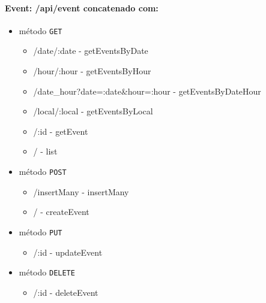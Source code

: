 \paragraph{Event: /api/event concatenado com:}
        \begin{itemize}
            \item método \texttt{GET}
                \begin{itemize}
                    \item /date/:date - getEventsByDate
                    \item /hour/:hour - getEventsByHour
                    \item /date\_hour?date=:date\&hour=:hour - getEventsByDateHour
                    \item /local/:local - getEventsByLocal
                    \item /:id - getEvent
                    \item / - list
                \end{itemize}
            \item método \texttt{POST}
                \begin{itemize}
                    \item /insertMany - insertMany
                    \item / - createEvent
                \end{itemize}
            \item método \texttt{PUT}
                \begin{itemize}
                    \item /:id - updateEvent
                \end{itemize}
            \item método \texttt{DELETE}
                \begin{itemize}
                    \item /:id - deleteEvent
                \end{itemize}
        \end{itemize}    

